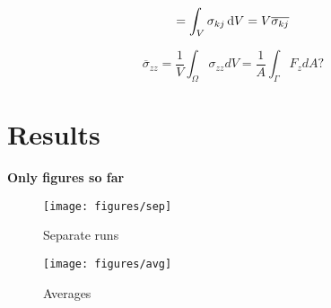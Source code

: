 \documentclass[crystal_plast.tex]{subfiles}
\begin{document}
\begin{equation}
= \int_V \sigma_{kj} \, \mathrm{d} V = V \overline{\sigma_{kj}}
\end{equation}


\[ \overline{\sigma}_{zz} = \frac{1}{V} \int_\Omega \sigma_{zz} dV = \frac{1}{A} \int_\Gamma F_{z} dA? \]



\section{Results}

\textbf{Only figures so far}



\begin{figure}[ht]
\centering
\texttt{[image: figures/sep]}
\caption{Separate runs}
\label{fig:sep}
\end{figure}

\begin{figure}[ht]
\centering
\texttt{[image: figures/avg]}
\caption{Averages}
\label{fig:avg}
\end{figure}



\newpage
\end{document}
